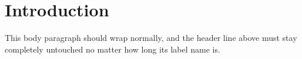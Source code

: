 \section{Introduction}\label{sec:intro}

This body paragraph should wrap normally, and the header line above must stay completely untouched no matter how long its label name is.
